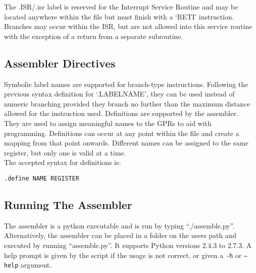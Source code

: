  The .ISR/.isr label is reserved for the Interrupt Service Routine and may be located anywhere within the file but must finish with a `RETI' instruction. 
Branches may occur within the ISR, but are not allowed into this service routine with the exception of a return from a separate subroutine. 

\subsection{Assembler Directives}
Symbolic label names are supported for branch-type instructions. Following the previous syntax definition for `.LABELNAME', they can be used instead of numeric branching provided they branch no further than the maximum distance allowed for the instruction used. 
Definitions are supported by the assembler. 
They are used to assign meaningful names to the GPRs to aid with programming.
Definitions can occur at any point within the file and create a mapping from that point onwards. 
Different names can be assigned to the same register, but only one is valid at a time. \\


 The accepted syntax for definitions is:

\begin{center}\texttt{.define NAME REGISTER}\end{center}

\subsection{Running The Assembler}\label{sect:runningassembler}

The assembler is a python executable and is run by typing ``./assemble.py''. 
Alternatively, the assembler can be placed in a folder on the users path and executed by running ``assemble.py''.
It supports Python versions 2.4.3 to 2.7.3.
A help prompt is given by the script if the usage is not correct, or given a \texttt{-h} or \texttt{--help} argument. 

